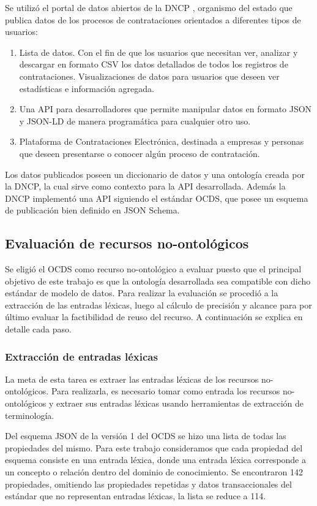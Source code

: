 Se utilizó el portal de datos abiertos de la DNCP \cite{DatosAbiDNCP:online}, organismo del estado que publica datos de los procesos de contrataciones orientados a diferentes tipos de usuarios:


\begin{enumerate}
    \item Lista de datos. Con el fin de que los usuarios que necesitan ver, analizar y descargar en formato CSV los datos detallados de todos los registros de contrataciones.
    Visualizaciones de datos para usuarios que deseen ver estadísticas e información agregada.
    \item Una API para desarrolladores que permite manipular datos en formato JSON y JSON-LD de manera programática para cualquier otro uso.
    \item Plataforma de Contrataciones Electrónica, destinada a empresas y personas que deseen presentarse o conocer algún proceso de contratación.
\end{enumerate}

Los datos publicados poseen un diccionario de datos y una ontología creada por la DNCP, la cual sirve como contexto para la API desarrollada. Además la DNCP implementó una API siguiendo el estándar OCDS, que posee un esquema de publicación bien definido en JSON Schema.

\subsection{Evaluación de recursos no-ontológicos}
Se eligió el OCDS como recurso no-ontológico a evaluar puesto que el principal objetivo de este trabajo es que la ontología desarrollada sea compatible con dicho estándar de modelo de datos. Para realizar la evaluación se procedió a la extracción de las entradas léxicas, luego al cálculo de precisión y alcance para por último evaluar la factibilidad de reuso del recurso.  A continuación se explica en detalle cada paso.

\subsubsection{Extracción de entradas léxicas}
La meta de esta tarea es extraer las entradas léxicas de los recursos no-ontológicos. Para realizarla, es necesario tomar como entrada los recursos no-ontológicos y extraer sus entradas léxicas usando herramientas de extracción de terminología.	
			
Del esquema JSON de la versión 1 del OCDS se hizo una lista de todas las propiedades del mismo. Para este trabajo consideramos que cada propiedad del esquema consiste en una entrada léxica, donde una entrada léxica corresponde a un concepto o relación dentro del dominio de conocimiento. Se encontraron 142 propiedades, omitiendo las propiedades repetidas y datos transaccionales del estándar que no representan entradas léxicas, la lista se reduce a 114.

